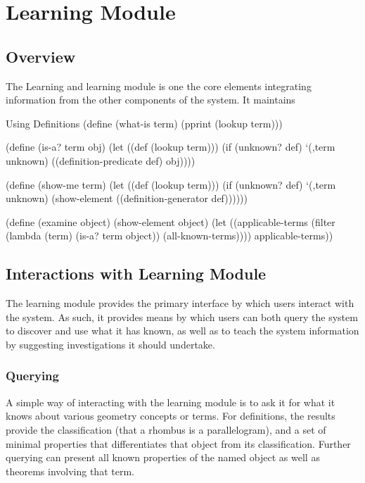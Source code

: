 \chapter{Learning Module}
\label{chap:learning}

\section{Overview}

The Learning and learning module is one the core elements integrating
information from the other components of the system. It maintains

\begin{code-example}{Using Definitions}
(define (what-is term)
  (pprint (lookup term)))

(define (is-a? term obj)
  (let ((def (lookup term)))
    (if (unknown? def)
        `(,term unknown)
        ((definition-predicate def) obj))))

(define (show-me term)
  (let ((def (lookup term)))
    (if (unknown? def)
        `(,term unknown)
        (show-element ((definition-generator def))))))

(define (examine object)
  (show-element object)
  (let ((applicable-terms
         (filter (lambda (term)
                   (is-a? term object))
                 (all-known-terms))))
    applicable-terms))
\end{code-example}



\section{Interactions with Learning Module}

The learning module provides the primary interface by which users
interact with the system. As such, it provides means by which users
can both query the system to discover and use what it has known, as
well as to teach the system information by suggesting investigations
it should undertake.

\subsection{Querying}

A simple way of interacting with the learning module is to ask it for
what it knows about various geometry concepts or terms. For
definitions, the results provide the classification (that a rhombus is
a parallelogram), and a set of minimal properties that differentiates
that object from its classification. Further querying can present all
known properties of the named object as well as theorems involving
that term.

